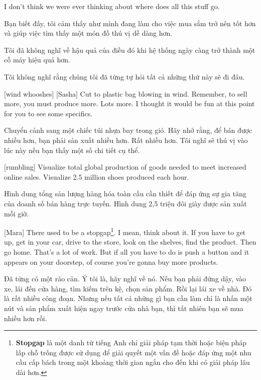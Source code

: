 \documentclass[a4paper]{article}
\begin{document}
	I don't think we were ever thinking about where does all this stuff go.
	
	\begin{vietnamese-v2}
		
		Bạn biết đấy, tôi cảm thấy như mình đang làm cho việc mua sắm trở nên tốt hơn và giúp việc tìm thấy một món đồ thú vị dễ dàng hơn. 
		
		Tôi đã không nghĩ về hậu quả của điều đó khi hệ thống ngày càng trở thành một cỗ máy hiệu quả hơn. 
		
		Tôi không nghĩ rằng chúng tôi đã từng tự hỏi tất cả những thứ này sẽ đi đâu.
	\end{vietnamese-v2}
	
	[wind whooshes]
	[Sasha] Cut to plastic bag blowing in wind.
	Remember, to sell more, you must produce more.
	Lots more.
	I thought it would be fun at this point for you to see some specifics.
	
	\begin{vietnamese-v2}
		 Chuyển cảnh sang một chiếc túi nhựa bay trong gió. 
		Hãy nhớ rằng, để bán được nhiều hơn, bạn phải sản xuất nhiều hơn. 
		Rất nhiều hơn. 
		Tôi nghĩ sẽ thú vị vào lúc này nếu bạn thấy một số chi tiết cụ thể.
	\end{vietnamese-v2}
	
	[rumbling]
	Visualize total global production of goods needed to meet increased online sales.
	Visualize 2.5 million shoes produced each hour.
	
	\begin{vietnamese-v2}
		[tiếng ầm ầm] 
		Hình dung tổng sản lượng hàng hóa toàn cầu cần thiết để đáp ứng sự gia tăng của doanh số bán hàng trực tuyến. 
		Hình dung 2,5 triệu đôi giày được sản xuất mỗi giờ.
	\end{vietnamese-v2}
	
	[Mara] There used to be a stopgap\footnote{
		\textbf{Stopgap} là một danh từ tiếng Anh chỉ giải pháp tạm thời hoặc biện pháp lấp chỗ trống được sử dụng để giải quyết một vấn đề hoặc đáp ứng một nhu cầu cấp bách trong một khoảng thời gian ngắn cho đến khi có giải pháp lâu dài hơn.
	}.  I mean, think about it.
	If you have to get up, get in your car, drive to the store, look on the shelves, find the product.
	Then go home.
	That's a lot of work.
	But if all you have to do is push a button and it appears on your doorstep, of course you're gonna buy more products.
	
	\begin{vietnamese-v2}
		[Mara] Đã từng có một rào cản. Ý tôi là, hãy nghĩ về nó. 
		Nếu bạn phải đứng dậy, vào xe, lái đến cửa hàng, tìm kiếm trên kệ, chọn sản phẩm. 
		Rồi lại lái xe về nhà. Đó là rất nhiều công đoạn. 
		Nhưng nếu tất cả những gì bạn cần làm chỉ là nhấn một nút và sản phẩm xuất hiện ngay trước cửa nhà bạn, thì tất nhiên bạn sẽ mua nhiều hơn rồi.
	\end{vietnamese-v2}
	
\end{document}
